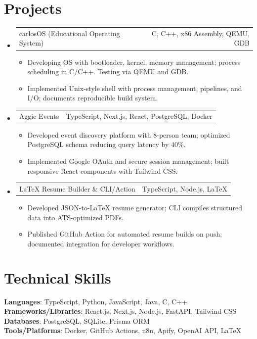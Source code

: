 \documentclass[letterpaper,11pt]{article}
\makeatletter
\newcommand{\resumeItem}[1]{%
  \item\small{{#1 \vspace{-2pt}}}
}
\newcommand{\resumeProjectHeading}[2]{%
    \item
    \begin{tabular*}{0.97\textwidth}{l@{\extracolsep{\fill}}r}
      \small#1 & #2 \\
    \end{tabular*}\vspace{-7pt}
}
\newcommand{\resumeSubHeadingListStart}{\begin{itemize}[leftmargin=0.15in, label={}]}
\newcommand{\resumeSubHeadingListEnd}{\end{itemize}}
\newcommand{\resumeItemListStart}{\begin{itemize}}
\newcommand{\resumeItemListEnd}{\end{itemize}\vspace{-5pt}}
\makeatother
\begin{document}
\section{Projects}
\resumeSubHeadingListStart

\resumeProjectHeading
{carlosOS (Educational Operating System)}{C, C++, x86 Assembly, QEMU, GDB}
\resumeItemListStart
\resumeItem{Developing OS with bootloader, kernel, memory management; process scheduling in C/C++. Testing via QEMU and GDB.}
\resumeItem{Implemented Unix-style shell with process management, pipelines, and I/O; documents reproducible build system.}
\resumeItemListEnd

\resumeProjectHeading
{Aggie Events}{TypeScript, Next.js, React, PostgreSQL, Docker}
\resumeItemListStart
\resumeItem{Developed event discovery platform with 8-person team; optimized PostgreSQL schema reducing query latency by 40\%.}
\resumeItem{Implemented Google OAuth and secure session management; built responsive React components with Tailwind CSS.}
\resumeItemListEnd

\resumeProjectHeading
{LaTeX Resume Builder \& CLI/Action}{TypeScript, Node.js, LaTeX}
\resumeItemListStart
\resumeItem{Developed JSON-to-LaTeX resume generator; CLI compiles structured data into ATS-optimized PDFs.}
\resumeItem{Published GitHub Action for automated resume builds on push; documented integration for developer workflows.}
\resumeItemListEnd

\resumeSubHeadingListEnd

\section{Technical Skills}
\begin{itemize}[leftmargin=0.15in, label={}]
  \small{\item{
    \textbf{Languages}{: TypeScript, Python, JavaScript, Java, C, C++} \\
    \textbf{Frameworks/Libraries}{: React.js, Next.js, Node.js, FastAPI, Tailwind CSS} \\
    \textbf{Databases}{: PostgreSQL, SQLite, Prisma ORM} \\
    \textbf{Tools/Platforms}{: Docker, GitHub Actions, n8n, Apify, OpenAI API, LaTeX}
  }}
\end{itemize}
\end{document}

